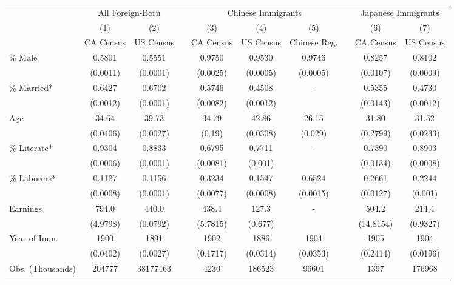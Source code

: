 \begin{tabular}{lccccccccc}
\hhline{==========}
& \multicolumn{2}{c}{All Foreign-Born} & & \multicolumn{3}{c}{Chinese Immigrants} & & \multicolumn{2}{c}{Japanese Immigrants} \\ 
\hhline{~--~---~--}
& (1) & (2) & & (3) & (4) & (5) & & (6) & (7) \\ 
& CA Census & US Census & & CA Census & US Census & Chinese Reg. & & CA Census & US Census \\ 
 \hhline{----------}
\% Male & 0.5801&0.5551&&0.9750&0.9530&0.9746&&0.8257&0.8102 \\ 
& (0.0011)&(0.0001)&&(0.0025)&(0.0005)&(0.0005)&&(0.0107)&(0.0009) \\ 
\% Married* & 0.6427&0.6702&&0.5746&0.4508&-&&0.5355&0.4730 \\ 
& (0.0012)&(0.0001)&&(0.0082)&(0.0012)&&&(0.0143)&(0.0012) \\ 
Age & 34.64&39.73&&34.79&42.86&26.15&&31.80&31.52 \\ 
& (0.0406)&(0.0027)&&(0.19)&(0.0308)&(0.029)&&(0.2799)&(0.0233) \\ 
\% Literate* & 0.9304&0.8833&&0.6795&0.7711&-&&0.7390&0.8903 \\ 
& (0.0006)&(0.0001)&&(0.0081)&(0.001)&&&(0.0134)&(0.0008) \\ 
\% Laborers* & 0.1127&0.1156&&0.3234&0.1547&0.6524&&0.2661&0.2244 \\ 
& (0.0008)&(0.0001)&&(0.0077)&(0.0008)&(0.0015)&&(0.0127)&(0.001) \\ 
Earnings & 794.0&440.0&&438.4&127.3&-&&504.2&214.4 \\ 
& (4.9798)&(0.0792)&&(5.7815)&(0.677)&&&(14.8154)&(0.9327) \\ 
Year of Imm. & 1900&1891&&1902&1886&1904&&1905&1904 \\ 
& (0.0402)&(0.0027)&&(0.1717)&(0.0314)&(0.0353)&&(0.2414)&(0.0196) \\ 
Obs. (Thousands)
&
204777&38177463&&4230&186523&96601&&1397&176968
\\ 
\hhline{----------}
\end{tabular}
